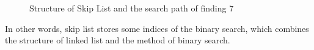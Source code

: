 \begin{figure}[H]
    \caption{Structure of Skip List and the search path of finding 7}\label{fig:skl}
\end{figure}
In other words, skip list stores some indices of the binary search, which combines the structure of linked list and the method of binary search.

